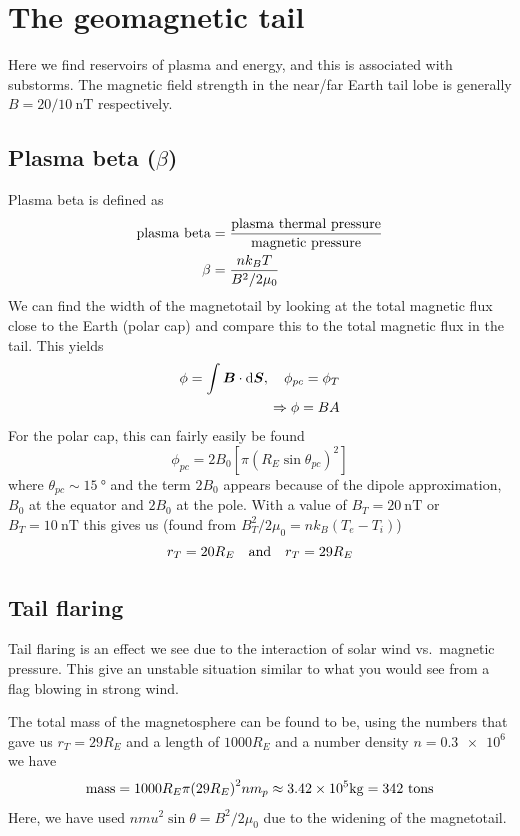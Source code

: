 \section{The geomagnetic tail}
Here we find reservoirs of plasma and energy, and this is associated with substorms. The magnetic field strength in the near/far Earth tail lobe is generally \(B=20/\SI{10}{\nano\tesla}\) respectively.

\subsection{Plasma beta (\(\beta \))}
Plasma beta is defined as
\begin{align*}
    \textnormal{plasma beta}&=\frac{\textnormal{plasma thermal pressure}}{\textnormal{magnetic pressure}}\\
    \beta&=\frac{nk_{B}T}{B^2/2\mu_0}
\end{align*}
We can find the width of the magnetotail by looking at the total magnetic flux close to the Earth (polar cap) and compare this to the total magnetic flux in the tail. This yields
\begin{align*}
    \phi=\int \boldsymbol{B}\cdot\textnormal{d}\boldsymbol{S},\quad \phi_{pc}=\phi_T\\
    \Rightarrow \phi=BA
\end{align*}
For the polar cap, this can fairly easily be found
\begin{equation*}
    \phi_{pc}=2B_0\left[\pi{\left(R_E\sin\theta_{pc}\right)}^2\right]
\end{equation*}
where \(\theta_{pc}\sim \SI{15}{\degree}\) and the term \(2B_0\) appears because of the dipole approximation, \(B_0\) at the equator and \(2B_0\) at the pole. With a value of \(B_T=\SI{20}{\nano\tesla}\) or \(B_T=\SI{10}{\nano\tesla}\) this gives us (found from \(B_T^2/2\mu_0=nk_B(T_e-T_i)\))
\begin{equation*}
    r_T=20 R_E\quad\textnormal{and}\quad r_T=29 R_E
\end{equation*}

\subsection{Tail flaring}
Tail flaring is an effect we see due to the interaction of solar wind vs.\ magnetic pressure. This give an unstable situation similar to what you would see from a flag blowing in strong wind.

The total mass of the magnetosphere can be found to be, using the numbers that gave us \(r_T=29R_E\) and a length of \(1000R_E\) and a number density \(n=\num{0.3e6}\) we have
\begin{equation*}
    \textnormal{mass}=1000R_E\pi{\left(29R_E\right)}^2nm_p\approx \num{3.42e5}\si{\kilo\gram}=342\textnormal{ tons}
\end{equation*}
Here, we have used \(nmu^2\sin\theta=B^2/2\mu_0\) due to the widening of the magnetotail.

